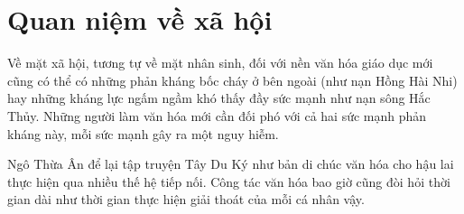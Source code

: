 \section{Quan niệm về xã hội} %
\label{sec:43_xa_hoi}

Về mặt xã hội, tương tự về mặt nhân sinh, đối với nền văn hóa giáo dục mới cũng có thể có những phản kháng bốc cháy ở bên ngoài (như nạn Hồng Hài Nhi) hay những kháng lực ngấm ngầm khó thấy đầy sức mạnh như nạn sông Hắc Thủy. Những người làm văn hóa mới cần đối phó với cả hai sức mạnh phản kháng này, mỗi sức mạnh gây ra một nguy hiễm.

Ngô Thừa Ân để lại tập truyện Tây Du Ký như bản di chúc văn hóa cho hậu lai thực hiện qua nhiều thế hệ tiếp nối. Công tác văn hóa bao giờ cũng đòi hỏi thời gian dài như thời gian thực hiện giải thoát của mỗi cá nhân vậy.

